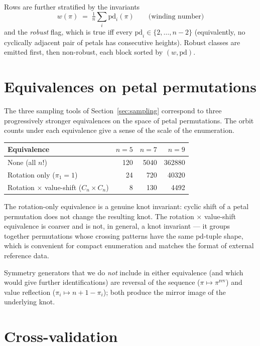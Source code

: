 \documentclass[11pt,oneside]{report}
\theoremstyle{definition}
\newcommand{\pd}{\mathrm{pd}}
\begin{document}
Rows are further stratified by the invariants
\[
w(\pi) \;=\; \tfrac{1}{n}\sum_i \pd_i(\pi) \qquad \text{(winding number)}
\]
and the \emph{robust} flag, which is true iff every $\pd_i \in \{2, \dots,
n-2\}$ (equivalently, no cyclically adjacent pair of petals has
consecutive heights). Robust classes are emitted first, then non-robust,
each block sorted by $(w, \pd)$.

\section{Equivalences on petal permutations}\label{sec:equivalences}

The three sampling tools of Section~\ref{sec:sampling} correspond to three
progressively stronger equivalences on the space of petal permutations. The
orbit counts under each equivalence give a sense of the scale of the
enumeration.

\begin{center}
\begin{tabular}{@{}lrrr@{}}
\hline
Equivalence & $n=5$ & $n=7$ & $n=9$ \\
\hline
None (all $n!$)                           & 120  & 5040 & 362880 \\
Rotation only ($\pi_1 = 1$)               & 24   & 720  & 40320  \\
Rotation $\times$ value-shift ($C_n \times C_n$) & 8 & 130 & 4492 \\
\hline
\end{tabular}
\end{center}

The rotation-only equivalence is a genuine knot invariant: cyclic shift of
a petal permutation does not change the resulting knot. The rotation
$\times$ value-shift equivalence is coarser and is not, in general, a
knot invariant --- it groups together permutations whose crossing patterns
have the same $\pd$-tuple shape, which is convenient for compact
enumeration and matches the format of external reference data.

Symmetry generators that we do \emph{not} include in either equivalence
(and which would give further identifications) are reversal of the
sequence ($\pi \mapsto \pi^{\mathrm{rev}}$) and value reflection
($\pi_i \mapsto n + 1 - \pi_i$); both produce the mirror image of the
underlying knot.

\section{Cross-validation}\label{sec:crossval}
\end{document}
